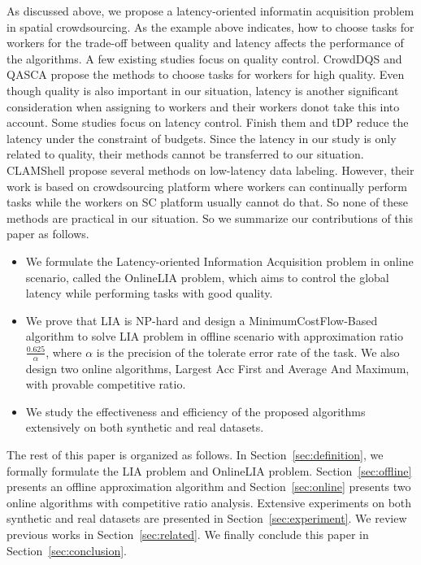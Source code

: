 As discussed above, we propose a latency-oriented informatin acquisition problem in spatial crowdsourcing.
As the example above indicates, how to choose tasks for workers for the trade-off between quality and latency affects the performance of the algorithms.
A few existing studies focus on quality control.
CrowdDQS\cite{CrowdDQS} and QASCA\cite{QASCA} propose the methods to choose tasks for workers for high quality.
Even though quality is also important in our situation, latency is another significant consideration when assigning to workers
and their workers donot take this into account.
Some studies focus on latency control.
Finish them\cite{gao2014finish} and tDP\cite{verroios2015tdp} reduce the latency under the constraint of budgets.
Since the latency in our study is only related to quality, their methods cannot be transferred to our situation.
CLAMShell\cite{haas2015clamshell} propose several methods on low-latency data labeling.
However, their work is based on crowdsourcing platform where workers can continually perform tasks while
the workers on SC platform usually cannot do that.
So none of these methods are practical in our situation.
So we summarize our contributions of this paper as follows.

\begin{itemize}
\item We formulate the Latency-oriented Information Acquisition problem in online scenario, 
called the OnlineLIA problem, which aims to control the global latency while performing tasks with good quality.

\item We prove that LIA is NP-hard and design a MinimumCostFlow-Based algorithm to solve LIA problem in offline scenario with approximation ratio $\frac{0.625}{\alpha}$,
where $\alpha$ is the precision of the tolerate error rate of the task. We also design two online algorithms, Largest Acc First and Average And Maximum, with provable competitive ratio.

\item We study the effectiveness and efficiency of the proposed algorithms extensively on both synthetic and real datasets. 
\end{itemize}

The rest of this paper is organized as follows. 
In Section~\ref{sec:definition}, we formally formulate the LIA problem and OnlineLIA problem.
Section~\ref{sec:offline} presents an offline approximation algorithm and
Section~\ref{sec:online} presents two online algorithms with competitive ratio analysis.
Extensive experiments on both synthetic and real datasets are presented in Section~\ref{sec:experiment}. 
We review previous works in Section~\ref{sec:related}. 
We finally conclude this paper in Section~\ref{sec:conclusion}.
